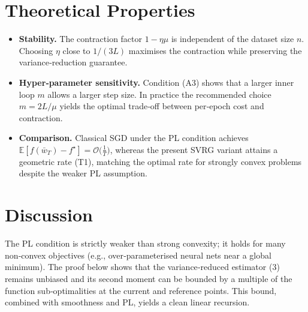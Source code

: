 \documentclass{article}
\newcommand{\EE}{\mathbb{E}}
\begin{document}
\section*{Theoretical Properties}
\begin{itemize}
\item \textbf{Stability.} The contraction factor $1-\eta\mu$ is independent of
the dataset size $n$.  Choosing $\eta$ close to $1/(3L)$ maximises the
contraction while preserving the variance‑reduction guarantee.
\item \textbf{Hyper‑parameter sensitivity.} Condition (A3) shows that a larger
inner loop $m$ allows a larger step size.  In practice the recommended
choice $m=2L/\mu$ yields the optimal trade‑off between per‑epoch cost and
contraction.
\item \textbf{Comparison.} Classical SGD under the PL condition achieves
$\EE[f(\bar w_T)-f^{\star}]=\mathcal O\!\bigl(\tfrac{1}{T}\bigr)$, whereas the
present SVRG variant attains a geometric rate (T1), matching the optimal
rate for strongly convex problems despite the weaker PL assumption.
\end{itemize}

\section*{Discussion}
The PL condition is strictly weaker than strong convexity; it holds for many
non‑convex objectives (e.g., over‑parameterised neural nets near a global
minimum).  The proof below shows that the variance‑reduced estimator (3)
remains unbiased and its second moment can be bounded by a multiple of the
function sub‑optimalities at the current and reference points.  This bound,
combined with smoothness and PL, yields a clean linear recursion.

\newpage
\end{document}
